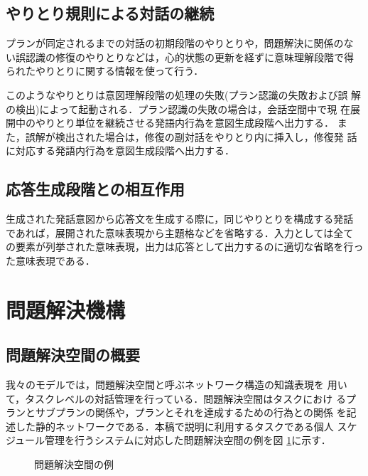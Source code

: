 \subsection{やりとり規則による対話の継続}

プランが同定されるまでの対話の初期段階のやりとりや，問題解決に関係のな
い誤認識の修復のやりとりなどは，心的状態の更新を経ずに意味理解段階で得
られたやりとりに関する情報を使って行う．

このようなやりとりは意図理解段階の処理の失敗(プラン認識の失敗および誤
解の検出)によって起動される．プラン認識の失敗の場合は，会話空間中で現
在展開中のやりとり単位を継続させる発語内行為を意図生成段階へ出力する．
また，誤解が検出された場合は，修復の副対話をやりとり内に挿入し，修復発
話に対応する発語内行為を意図生成段階へ出力する．

\subsection{応答生成段階との相互作用}

生成された発話意図から応答文を生成する際に，同じやりとりを構成する発話
であれば，展開された意味表現から主題格などを省略する．入力としては全て
の要素が列挙された意味表現，出力は応答として出力するのに適切な省略を行っ
た意味表現である．

\section{問題解決機構}
\label{prob}

\subsection{問題解決空間の概要}

我々のモデルでは，{\dg 問題解決空間}と呼ぶネットワーク構造の知識表現を
用いて，タスクレベルの対話管理を行っている．問題解決空間はタスクにおけ
るプランとサブプランの関係や，プランとそれを達成するための行為との関係
を記述した静的ネットワークである．本稿で説明に利用するタスクである個人
スケジュール管理を行うシステムに対応した問題解決空間の例を図
\ref{event}に示す．

\begin{figure}[htbp]
\vspace{-4mm}
\begin{center}
\end{center}
\caption{問題解決空間の例}
\label{event}
\end{figure}

